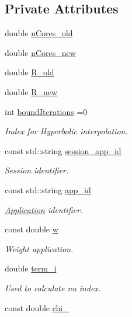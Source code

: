 \subsection*{Private Attributes}
\begin{DoxyCompactItemize}
\item 
double \hyperlink{classApplication_a425bb14c5264f07d9eafa6f9caa6a8b1}{n\-Cores\-\_\-old}
\item 
double \hyperlink{classApplication_af7b37c07da0fefef4d86ed3c567b08d2}{n\-Cores\-\_\-new}
\item 
double \hyperlink{classApplication_a950cfc8da4a8e4640aee8d2840f53e0e}{R\-\_\-old}
\item 
double \hyperlink{classApplication_a9e94824741ac0c52d0fa5ede30c72fa1}{R\-\_\-new}
\item 
int \hyperlink{classApplication_a6a3692743eccba602a58fdfc3f23950b}{bound\-Iterations} =0
\begin{DoxyCompactList}\small\item\em Index for Hyperbolic interpolation. \end{DoxyCompactList}\item 
const std\-::string \hyperlink{classApplication_a6152c40564d526b9b60871c98f7a51c7}{session\-\_\-app\-\_\-id}
\begin{DoxyCompactList}\small\item\em Session identifier. \end{DoxyCompactList}\item 
const std\-::string \hyperlink{classApplication_a5cedee59cfd3cbf89d02174e2f521493}{app\-\_\-id}
\begin{DoxyCompactList}\small\item\em \hyperlink{classApplication}{Application} identifier. \end{DoxyCompactList}\item 
const double \hyperlink{classApplication_a89e171cf287b09ce4b37dd94c0d61e2b}{w}
\begin{DoxyCompactList}\small\item\em Weight application. \end{DoxyCompactList}\item 
double \hyperlink{classApplication_ad5486702327ad61e56ed04fb54d58c20}{term\-\_\-i}
\begin{DoxyCompactList}\small\item\em Used to calculate nu index. \end{DoxyCompactList}\item 
const double \hyperlink{classApplication_a6066fad4c229a6035652efd712d0d78c}{chi\-\_}

\end{DoxyCompactItemize}
